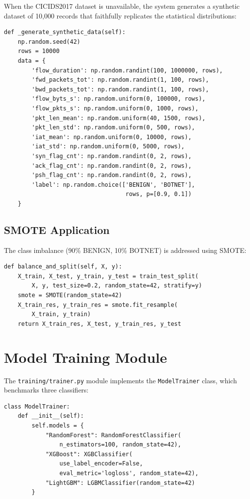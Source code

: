 When the CICIDS2017 dataset is unavailable, the system generates a synthetic dataset of 10,000 records that faithfully replicates the statistical distributions:

\begin{lstlisting}[caption={Synthetic CICIDS2017-like Data Generation}, label={lst:synthetic}]
def _generate_synthetic_data(self):
    np.random.seed(42)
    rows = 10000
    data = {
        'flow_duration': np.random.randint(100, 1000000, rows),
        'fwd_packets_tot': np.random.randint(1, 100, rows),
        'bwd_packets_tot': np.random.randint(1, 100, rows),
        'flow_byts_s': np.random.uniform(0, 100000, rows),
        'flow_pkts_s': np.random.uniform(0, 1000, rows),
        'pkt_len_mean': np.random.uniform(40, 1500, rows),
        'pkt_len_std': np.random.uniform(0, 500, rows),
        'iat_mean': np.random.uniform(0, 10000, rows),
        'iat_std': np.random.uniform(0, 5000, rows),
        'syn_flag_cnt': np.random.randint(0, 2, rows),
        'ack_flag_cnt': np.random.randint(0, 2, rows),
        'psh_flag_cnt': np.random.randint(0, 2, rows),
        'label': np.random.choice(['BENIGN', 'BOTNET'],
                                   rows, p=[0.9, 0.1])
    }
\end{lstlisting}

\subsection{SMOTE Application}

The class imbalance (90\% BENIGN, 10\% BOTNET) is addressed using SMOTE:

\begin{lstlisting}[caption={SMOTE Class Balancing}, label={lst:smote}]
def balance_and_split(self, X, y):
    X_train, X_test, y_train, y_test = train_test_split(
        X, y, test_size=0.2, random_state=42, stratify=y)
    smote = SMOTE(random_state=42)
    X_train_res, y_train_res = smote.fit_resample(
        X_train, y_train)
    return X_train_res, X_test, y_train_res, y_test
\end{lstlisting}

\section{Model Training Module}

The \texttt{training/trainer.py} module implements the \texttt{ModelTrainer} class, which benchmarks three classifiers:

\begin{lstlisting}[caption={Multi-Model Benchmarking}, label={lst:trainer}]
class ModelTrainer:
    def __init__(self):
        self.models = {
            "RandomForest": RandomForestClassifier(
                n_estimators=100, random_state=42),
            "XGBoost": XGBClassifier(
                use_label_encoder=False,
                eval_metric='logloss', random_state=42),
            "LightGBM": LGBMClassifier(random_state=42)
        }
\end{lstlisting}

